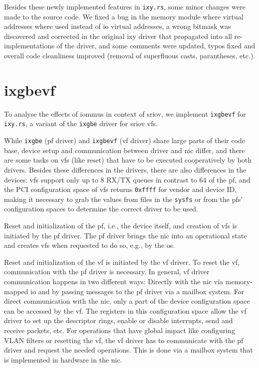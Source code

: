 Besides these newly implemented features in \texttt{ixy.rs}, some minor changes
were made to the source code. We fixed a bug in the memory module where virtual
addresses where used instead of \ac{io} virtual addresses, a wrong bitmask was
discovered and corrected in the original ixy driver \cite{emmerich2019user} that
propagated into all re-implementations \cite{emmerich2019case} of the driver,
and some comments were updated, typos fixed and overall code cleanliness
improved (removal of superfluous casts, parantheses, etc.).


\section{ixgbevf}
\label{sec:ixgbevf}

To analyse the effects of \acp{iommu} in context of \ac{sriov}, we implement
\texttt{ixgbevf} for \texttt{ixy.rs}, a variant of the \texttt{ixgbe} driver for
\ac{sriov} \acp{vf}.

While \texttt{ixgbe} (\ac{pf} driver) and \texttt{ixgbevf} (\ac{vf} driver)
share large parts of their code base, device setup and communication between
driver and \ac{nic} differ, and there are some tasks on \acp{vf} (like reset)
that have to be executed cooperatively by both drivers. Besides these
differences in the drivers, there are also differences in the devices: \acp{vf}
support only up to 8 RX/TX queues in contrast to 64 of the \ac{pf}, and the PCI
configuration space of \acp{vf} returns \texttt{0xffff} for vendor and device
ID, making it necessary to grab the values from files in the \texttt{sysfs} or
from the \acp{pf}' configuration spaces to determine the correct driver to be
used.

Reset and initialization of the \ac{pf}, i.e., the device itself, and creation
of \acp{vf} is initiated by the \ac{pf} driver. The \ac{pf} driver brings the
\ac{nic} into an operational state and creates \acp{vf} when requested to do so,
e.g., by the \ac{os}.

Reset and initialization of the \ac{vf} is initiated by the \ac{vf} driver. To
reset the \ac{vf}, communication with the \ac{pf} driver is necessary. In
general, \ac{vf} driver communication happens in two different ways: Directly
with the \ac{nic} via memory-mapped \ac{io} and by passing messages to the
\ac{pf} driver via a mailbox system. For direct communication with the \ac{nic},
only a part of the device configuration space can be accessed by the \ac{vf}.
The registers in this configuration space allow the \ac{vf} driver to set up the
descriptor rings, enable or disable interrupts, send and receive packets, etc.
For operations that have global impact like configuring VLAN filters or
resetting the \ac{vf}, the \ac{vf} driver has to communicate with the \ac{pf}
driver and request the needed operations. This is done via a mailbox system that
is implemented in hardware in the \ac{nic}.

